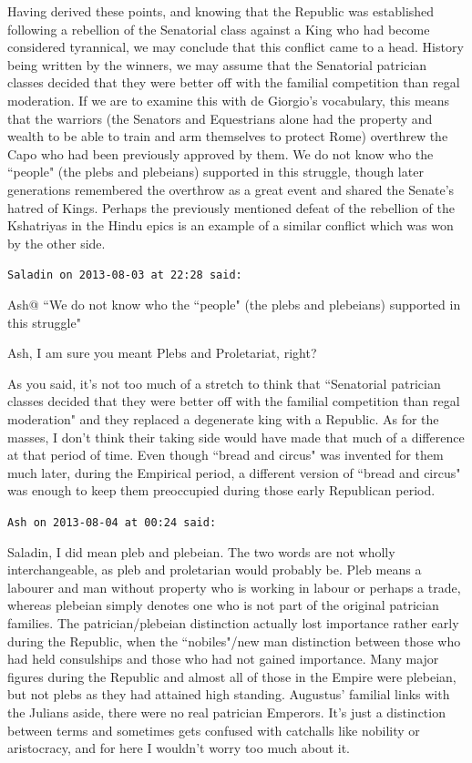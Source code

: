 \begin{footnotesize}
\begin{sffamily}
Having derived these points, and knowing that the Republic was established following a rebellion of the Senatorial class against a King who had become considered tyrannical, we may conclude that this conflict came to a head. History being written by the winners, we may assume that the Senatorial patrician classes decided that they were better off with the familial competition than regal moderation. If we are to examine this with de Giorgio's vocabulary, this means that the warriors (the Senators and Equestrians alone had the property and wealth to be able to train and arm themselves to protect Rome) overthrew the Capo who had been previously approved by them. We do not know who the ``people" (the plebs and plebeians) supported in this struggle, though later generations remembered the overthrow as a great event and shared the Senate's hatred of Kings. Perhaps the previously mentioned defeat of the rebellion of the Kshatriyas in the Hindu epics is an example of a similar conflict which was won by the other side.


\hfill

\texttt{Saladin on 2013-08-03 at 22:28 said: }

Ash@ ``We do not know who the ``people" (the plebs and plebeians) supported in this struggle"

Ash, I am sure you meant Plebs and Proletariat, right?

As you said, it's not too much of a stretch to think that ``Senatorial patrician classes decided that they were better off with the familial competition than regal moderation" and they replaced a degenerate king with a Republic. As for the masses, I don't think their taking side would have made that much of a difference at that period of time. Even though ``bread and circus" was invented for them much later, during the Empirical period, a different version of ``bread and circus" was enough to keep them preoccupied during those early Republican period.


\hfill

\texttt{Ash on 2013-08-04 at 00:24 said: }

Saladin, I did mean pleb and plebeian. The two words are not wholly interchangeable, as pleb and proletarian would probably be. Pleb means a labourer and man without property who is working in labour or perhaps a trade, whereas plebeian simply denotes one who is not part of the original patrician families. The patrician/plebeian distinction actually lost importance rather early during the Republic, when the ``nobiles"/new man distinction between those who had held consulships and those who had not gained importance. Many major figures during the Republic and almost all of those in the Empire were plebeian, but not plebs as they had attained high standing. Augustus' familial links with the Julians aside, there were no real patrician Emperors. It's just a distinction between terms and sometimes gets confused with catchalls like nobility or aristocracy, and for here I wouldn't worry too much about it.



\end{sffamily}
\end{footnotesize}
